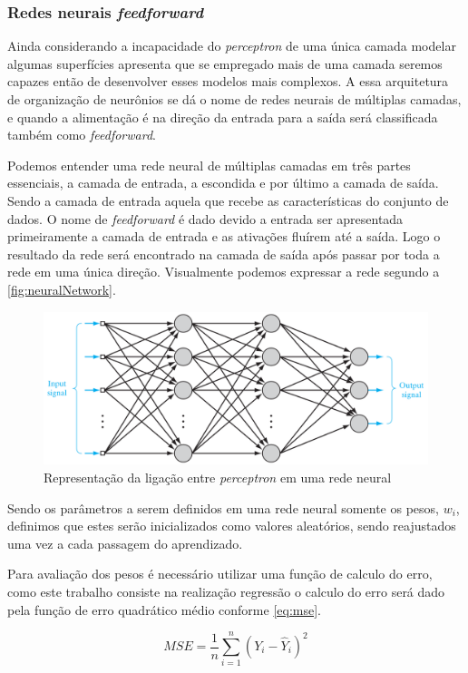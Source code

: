 \documentclass[
    12pt,
    oneside,
    a4paper,
    english,
    brazil
]{abntex2}
\begin{document}
\subsubsection{Redes neurais \textit{feedforward}}

Ainda considerando  a incapacidade do  \textit{perceptron} de uma  única camada
modelar algumas superfícies  apresenta que se empregado mais
de  uma  camada  seremos  capazes  então  de  desenvolver  esses  modelos  mais
complexos. A essa arquitetura de organização de neurônios se dá o nome de redes
neurais de  múltiplas camadas, e quando  a alimentação é na  direção da entrada
para a saída será classificada também como \textit{feedforward}.

Podemos  entender  uma  rede  neural   de  múltiplas  camadas  em  três  partes
essenciais, a camada  de entrada, a escondida  e por último a  camada de saída.
Sendo a camada  de entrada aquela que recebe as  características do conjunto de
dados. O nome  de \textit{feedforward} é dado devido a  entrada ser apresentada
primeiramente a camada  de entrada e as  ativações fluírem até a  saída. Logo o
resultado da  rede será encontrado  na camada de saída  após passar por  toda a
rede  em uma  única direção.  Visualmente podemos  expressar a  rede segundo  a
\autoref{fig:neuralNetwork}.

\begin{figure}[ht]
    \centering
    \caption{Representação da ligação entre \textit{perceptron} em uma rede
    neural}\label{fig:neuralNetwork}
    \includegraphics[width=.5\linewidth]{images/neuralNetwork.png}
\end{figure}

Sendo os  parâmetros a  serem definidos  em uma rede  neural somente  os pesos,
$w_i$, definimos que  estes serão inicializados como  valores aleatórios, sendo
reajustados uma vez a cada passagem do aprendizado.

Para avaliação dos  pesos é necessário utilizar uma função  de calculo do erro,
como este trabalho consiste na realização regressão o calculo do erro será dado
pela função de erro quadrático médio conforme \autoref{eq:mse}.

\begin{equation}\label{eq:mse}
    MSE = \frac{1}{n}\sum_{i=1}^{n}{(Y_i - \hat{Y}_i)^2}
\end{equation}
\end{document}
